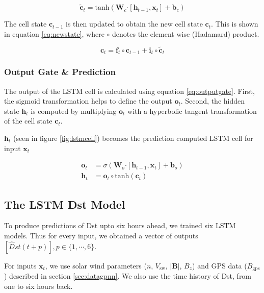 \begin{equation}\label{eq:candidate}
 \tilde{\mathbf{c}}_{t} = \text{tanh} \left( \mathbf{W}_{c} \boldsymbol{\cdot}  \left[ \mathbf{h}_{t-1},\mathbf{x}_t \right] + 
 \mathbf{b}_{c} \right)
\end{equation}

The cell state  $\mathbf{c}_{t-1}$ is then updated to obtain the new cell state $\mathbf{c}_t$. This 
is shown in equation \ref{eq:newstate}, where $\circ$ denotes the element wise (Hadamard) product. 

\begin{equation}\label{eq:newstate}
 \mathbf{c}_t = \mathbf{f}_{t} \circ \mathbf{c}_{t-1} + \mathbf{i}_{t} \circ \tilde{\mathbf{c}}_{t}
\end{equation}

\subsubsection*{Output Gate \& Prediction}

The output of the LSTM cell is calculated using equation \ref{eq:outputgate}. First, the 
sigmoid transformation helps to define the output $\mathbf{o}_t$. Second, the hidden state $\mathbf{h}_t$ 
is computed by multiplying $\mathbf{o}_{t}$ with a hyperbolic tangent transformation of the cell state 
$\mathbf{c}_{t}$. 

$\mathbf{h}_{t}$ (seen in figure \ref{fig:lstmcell}) becomes the prediction computed LSTM cell for input 
$\mathbf{x}_t$


\begin{align} \label{eq:outputgate}
	\mathbf{o}_{t} &= \sigma \left( 
		\mathbf{W}_o \boldsymbol{\cdot} \left[\mathbf{h}_{t-1}, \mathbf{x}_{t} \right] + \mathbf{b}_o \right) \\
	\mathbf{h}_{t} &= \mathbf{o}_{t} \circ \text{tanh}(\mathbf{c}_t)
\end{align}

\subsection{The LSTM Dst Model}\label{sec:lstmDstArch}

To produce predictions of Dst upto six hours ahead, we trained six LSTM models. Thus for every input, we 
obtained a vector of outputs $[\hat{D}st\left(t + p\right)], p\in \{ 1, \cdots, 6 \}$.

For inputs $\mathbf{x}_t$, we use solar wind parameters ($n$, $V_{\text{sw}}$, $|\mathbf{B}|$, $B_{z}$) 
and GPS data ($B_{\text{gps}}$) described in section \ref{sec:datagpnn}. We also use the time history of Dst, 
from one to six hours back.

